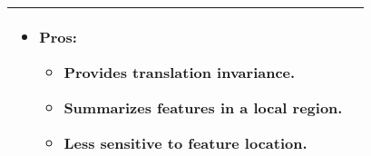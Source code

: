 \begin{summary}
\begin{center}
\begin{tabular}{ll}
{\begin{itemize}
                    \item \textbf{Pros:}
                    \begin{itemize}
                        \item Provides translation invariance.
                        \item Summarizes features in a local region.
                        \item Less sensitive to feature location. 
                    \end{itemize}
                \end{itemize}} \\
            \bottomrule
        \end{tabular}
    \end{center}
\end{summary}
\newpage

